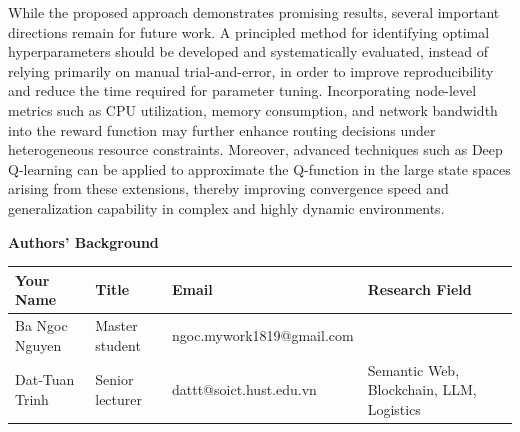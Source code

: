 \documentclass[lnbip]{svmultln}
\begin{document}
While the proposed approach demonstrates promising results, several important directions remain for future work. A principled method for identifying optimal hyperparameters should be developed and systematically evaluated, instead of relying primarily on manual trial-and-error, in order to improve reproducibility and reduce the time required for parameter tuning. Incorporating node-level metrics such as CPU utilization, memory consumption, and network bandwidth into the reward function may further enhance routing decisions under heterogeneous resource constraints. Moreover, advanced techniques such as Deep Q-learning \cite{pmlr-v120-yang20a} can be applied to approximate the Q-function in the large state spaces arising from these extensions, thereby improving convergence speed and generalization capability in complex and highly dynamic environments.

\printbibliography

\vspace{0.5cm}

\textbf{Authors' Background}

\vspace{0.25cm}

{
\setlength{\tabcolsep}{4pt}
\renewcommand{\arraystretch}{1.4}
\begin{tabularx}{\textwidth}{|l|X|X|X|}
\hline
\small
\textbf{Your Name} &
\textbf{Title} &
\textbf{Email} &
\textbf{Research Field} \\
\hline
Ba Ngoc Nguyen & Master student  & ngoc.mywork1819@\allowbreak gmail.com & \\
\hline
Dat-Tuan Trinh & Senior lecturer & dattt@soict.hust.\allowbreak edu.\allowbreak vn & Semantic Web, Blockchain, LLM, Logistics \\
\hline
\end{tabularx}
}


\end{document}
